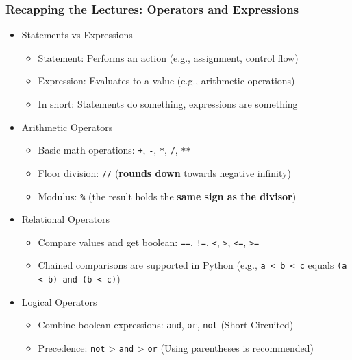 \documentclass{beamer}
\begin{document}
\begin{frame}
    \frametitle{Recapping the Lectures: Operators and Expressions}

    \begin{itemize}
        \item Statements vs Expressions
              \begin{itemize}
                  \item Statement: Performs an action (e.g., assignment, control flow)
                  \item Expression: Evaluates to a value (e.g., arithmetic operations)
                  \item In short: Statements do something, expressions are something
              \end{itemize}
        \item Arithmetic Operators
              \begin{itemize}
                  \item Basic math operations: \texttt{+}, \texttt{-}, \texttt{*}, \texttt{/}, \texttt{**}
                  \item Floor division: \texttt{//} (\textbf{rounds down} towards negative infinity)
                  \item Modulus: \texttt{\%} (the result holds the \textbf{same sign as the divisor})
              \end{itemize}
        \item Relational Operators
              \begin{itemize}
                  \item Compare values and get boolean: \texttt{==}, \texttt{!=}, \texttt{<}, \texttt{>}, \texttt{<=}, \texttt{>=}
                  \item Chained comparisons are supported in Python (e.g., \texttt{a < b < c} equals \texttt{(a < b) and (b < c)})
              \end{itemize}
        \item Logical Operators
              \begin{itemize}
                  \item Combine boolean expressions: \texttt{and}, \texttt{or}, \texttt{not} (Short Circuited)
                  \item Precedence: \texttt{not} > \texttt{and} > \texttt{or} (Using parentheses is recommended)
              \end{itemize}
    \end{itemize}

\end{frame}
\end{document}
